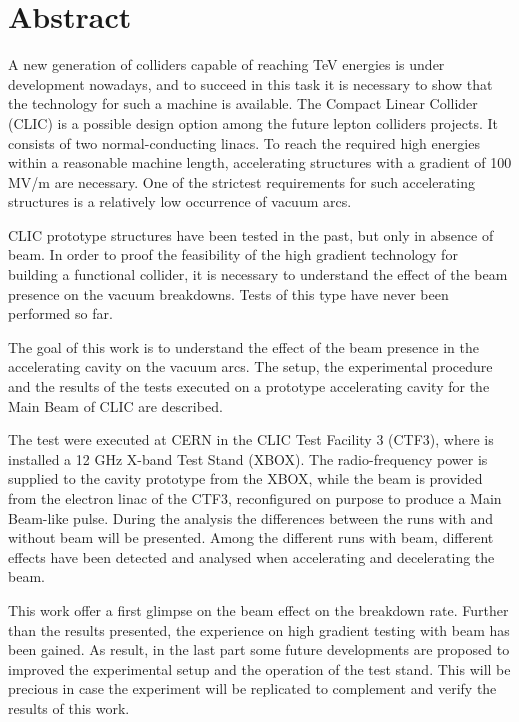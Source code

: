 \chapter*{Abstract}

A new generation of colliders capable of reaching TeV energies is under development nowadays, and to succeed in this task it is necessary to show that the technology for such a machine is available. The Compact Linear Collider (CLIC) is a possible design option among the future lepton colliders projects. It consists of two normal-conducting linacs. To reach the required high energies within a reasonable machine length, accelerating structures with a gradient of 100 MV/m are necessary. One of the strictest requirements for such accelerating structures is a relatively low occurrence of vacuum arcs. 

CLIC prototype structures have been tested in the past, but only in absence of beam. In order to proof the feasibility of the high gradient technology for building a functional collider, it is necessary to understand the effect of the beam presence on the vacuum breakdowns. Tests of this type have never been performed so far. 

The goal of this work is to understand the effect of the beam presence in the accelerating cavity on the vacuum arcs. The setup, the experimental procedure and the results of the tests executed on a prototype accelerating cavity for the Main Beam of CLIC are described. 

The test were executed at CERN in the CLIC Test Facility 3 (CTF3), where is installed a 12 GHz X-band Test Stand (XBOX). The radio-frequency power is supplied to the cavity prototype from the XBOX, while the beam is provided from the electron linac of the CTF3, reconfigured on purpose to produce a Main Beam-like pulse. 
During the analysis the differences between the runs with and without beam will be presented. Among the different runs with beam, different effects have been detected and analysed when accelerating and decelerating the beam. 

This work offer a first glimpse on the beam effect on the breakdown rate. Further than the results presented, the experience on high gradient testing with beam has been gained. As result, in the last part some future developments are proposed to improved the experimental setup and the operation of the test stand. This will be precious in case the experiment will be replicated to complement and verify the results of this work. 
